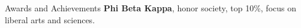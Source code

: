 \begin{rubric}{Awards and Achievements}
\entry*[2018] \textbf{Phi Beta Kappa}, honor society, top 10\%, focus on liberal arts and sciences.
\end{rubric}